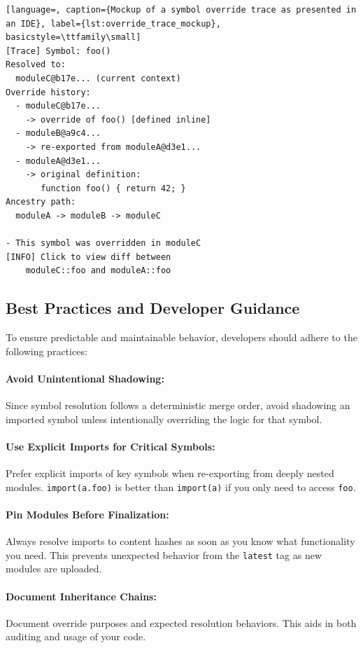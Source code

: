 \documentclass[sigplan,screen]{acmart}
\begin{document}
\begin{lstlisting}[language=, caption={Mockup of a symbol override trace as presented in an IDE}, label={lst:override_trace_mockup}, basicstyle=\ttfamily\small]
[Trace] Symbol: foo()
Resolved to:
  moduleC@b17e... (current context)
Override history:
  - moduleC@b17e...
    -> override of foo() [defined inline]
  - moduleB@a9c4...
    -> re-exported from moduleA@d3e1...
  - moduleA@d3e1...
    -> original definition:
       function foo() { return 42; }
Ancestry path:
  moduleA -> moduleB -> moduleC

- This symbol was overridden in moduleC
[INFO] Click to view diff between 
    moduleC::foo and moduleA::foo
\end{lstlisting}

\subsection{Best Practices and Developer Guidance}
\label{sec:best-practices}

To ensure predictable and maintainable behavior, developers should adhere to the following practices:

\paragraph{Avoid Unintentional Shadowing:} Since symbol resolution follows a deterministic merge order, avoid shadowing an imported symbol unless intentionally overriding the logic for that symbol.

\paragraph{Use Explicit Imports for Critical Symbols:} Prefer explicit imports of key symbols when re-exporting from deeply nested modules. \texttt{import(a.foo)} is better than \texttt{import(a)} if you only need to access \texttt{foo}.

\paragraph{Pin Modules Before Finalization:} Always resolve imports to content hashes as soon as you know what functionality you need. This prevents unexpected behavior from the \texttt{latest} tag as new modules are uploaded. 

\paragraph{Document Inheritance Chains:} Document override purposes and expected resolution behaviors. This aids in both auditing and usage of your code.
\end{document}
